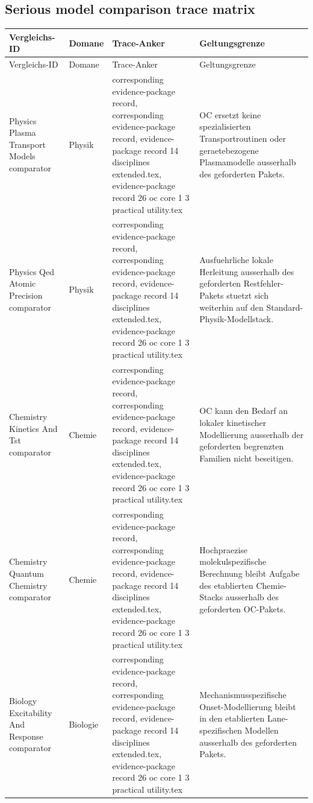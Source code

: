\subsection{Serious model comparison trace matrix}
\begin{longtable}{@{}L{0.20\textwidth}L{0.11\textwidth}L{0.33\textwidth}L{0.28\textwidth}@{}}
\toprule
Vergleichs-ID & Domane & Trace-Anker & Geltungsgrenze \\
\midrule
\endfirsthead
\toprule
Vergleichs-ID & Domane & Trace-Anker & Geltungsgrenze \\
\midrule
\endhead
Physics Plasma Transport Models comparator & Physik & corresponding evidence-package record, corresponding evidence-package record, \allowbreak evidence-package record 14 disciplines extended.tex, \allowbreak evidence-package record 26 oc core 1 3 practical utility.tex & OC ersetzt keine spezialisierten Transportroutinen oder geraetebezogene Plasmamodelle ausserhalb des geforderten Pakets. \\
Physics Qed Atomic Precision comparator & Physik & corresponding evidence-package record, corresponding evidence-package record, \allowbreak evidence-package record 14 disciplines extended.tex, \allowbreak evidence-package record 26 oc core 1 3 practical utility.tex & Ausfuehrliche lokale Herleitung ausserhalb des geforderten Restfehler-Pakets stuetzt sich weiterhin auf den Standard-Physik-Modellstack. \\
Chemistry Kinetics And Tst comparator & Chemie & corresponding evidence-package record, corresponding evidence-package record, \allowbreak evidence-package record 14 disciplines extended.tex, \allowbreak evidence-package record 26 oc core 1 3 practical utility.tex & OC kann den Bedarf an lokaler kinetischer Modellierung ausserhalb der geforderten begrenzten Familien nicht beseitigen. \\
Chemistry Quantum Chemistry comparator & Chemie & corresponding evidence-package record, corresponding evidence-package record, \allowbreak evidence-package record 14 disciplines extended.tex, \allowbreak evidence-package record 26 oc core 1 3 practical utility.tex & Hochpraezise molekulspezifische Berechnung bleibt Aufgabe des etablierten Chemie-Stacks ausserhalb des geforderten OC-Pakets. \\
Biology Excitability And Response comparator & Biologie & corresponding evidence-package record, corresponding evidence-package record, \allowbreak evidence-package record 14 disciplines extended.tex, \allowbreak evidence-package record 26 oc core 1 3 practical utility.tex & Mechanismusspezifische Onset-Modellierung bleibt in den etablierten Lane-spezifischen Modellen ausserhalb des geforderten Pakets. \\

\end{longtable}
